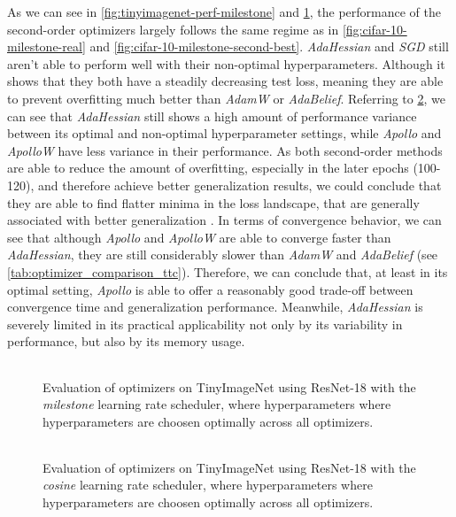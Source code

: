As we can see in \ref{fig:tinyimagenet-perf-milestone} and \ref{fig:tinyimagenet-perf-cosine}, the performance of the second-order optimizers 
largely follows the same regime as in \ref{fig:cifar-10-milestone-real} and \ref{fig:cifar-10-milestone-second-best}. \emph{AdaHessian} and \emph{SGD} still aren't able to perform 
well with their non-optimal hyperparameters. Although it shows that they both have a steadily decreasing test loss, 
meaning they are able to prevent overfitting much better than \emph{AdamW} or \emph{AdaBelief}. 
Referring to \ref{fig:tinyimagenet-perf-opt}, we can see that \emph{AdaHessian} still shows a high amount of performance variance 
between its optimal and non-optimal hyperparameter settings, while \emph{Apollo} and \emph{ApolloW} have less variance in their performance. 
As both second-order methods are able to reduce the amount of overfitting, especially in the later epochs (100-120), and therefore 
achieve better generalization results, we could conclude that they are able to find flatter minima in the loss landscape, that
are generally associated with better generalization \cite{Goodfellow-et-al-2016}.
In terms of convergence behavior, we can see that although \emph{Apollo} and \emph{ApolloW} are able
to converge faster than \emph{AdaHessian}, they are still considerably slower than \emph{AdamW} and \emph{AdaBelief} (see \ref{tab:optimizer_comparison_ttc}). 
Therefore, we can conclude that, at least in its optimal setting, \emph{Apollo} is able to offer a reasonably good 
trade-off between convergence time and generalization performance. Meanwhile, \emph{AdaHessian} is severely limited in its practical 
applicability not only by its variability in performance, but also by its memory usage.

\begin{figure}[h!]
    \centering
    \begin{tabular}{cc}
         \\ 
    \end{tabular}
    \caption{Evaluation of optimizers on TinyImageNet using ResNet-18 with the \emph{milestone} learning rate scheduler, where hyperparameters
    where hyperparameters are choosen optimally across all optimizers. }
    \label{fig:tinyimagenet-perf-cosine}
\end{figure}
\begin{figure}[h!]
    \centering
    \begin{tabular}{cc}
         \\ 
    \end{tabular}
    \caption{Evaluation of optimizers on TinyImageNet using ResNet-18 with the \emph{cosine} learning rate scheduler, where hyperparameters
    where hyperparameters are choosen optimally across all optimizers.}
    \label{fig:tinyimagenet-perf-opt}
\end{figure}

